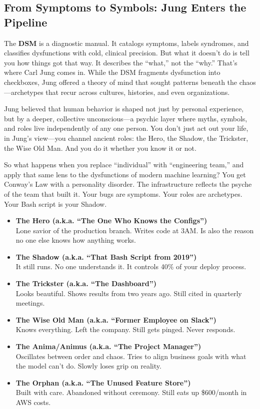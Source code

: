 \subsection{From Symptoms to Symbols: Jung Enters the Pipeline}

The \textbf{DSM} is a diagnostic manual. It catalogs symptoms, labels syndromes, and classifies dysfunctions with cold, clinical precision. But what it doesn’t do is tell you how things got that way. It describes the “what,” not the “why.” That’s where Carl Jung comes in. While the DSM fragments dysfunction into checkboxes, Jung offered a theory of mind that sought patterns beneath the chaos—archetypes that recur across cultures, histories, and even organizations.

Jung believed that human behavior is shaped not just by personal experience, but by a deeper, collective unconscious—a psychic layer where myths, symbols, and roles live independently of any one person. You don’t just act out your life, in Jung’s view—you channel ancient roles: the Hero, the Shadow, the Trickster, the Wise Old Man. And you do it whether you know it or not.

So what happens when you replace “individual” with “engineering team,” and apply that same lens to the dysfunctions of modern machine learning? You get Conway’s Law with a personality disorder. The infrastructure reflects the psyche of the team that built it. Your bugs are symptoms. Your roles are archetypes. Your Bash script is your Shadow.

\begin{itemize}
  \item \textbf{The Hero (a.k.a. “The One Who Knows the Configs”)}\\
  Lone savior of the production branch. Writes code at 3AM. Is also the reason no one else knows how anything works.

  \item \textbf{The Shadow (a.k.a. “That Bash Script from 2019”)}\\
  It still runs. No one understands it. It controls 40\% of your deploy process.

  \item \textbf{The Trickster (a.k.a. “The Dashboard”)}\\
  Looks beautiful. Shows results from two years ago. Still cited in quarterly meetings.

  \item \textbf{The Wise Old Man (a.k.a. “Former Employee on Slack”)}\\
  Knows everything. Left the company. Still gets pinged. Never responds.

  \item \textbf{The Anima/Animus (a.k.a. “The Project Manager”)}\\
  Oscillates between order and chaos. Tries to align business goals with what the model can’t do. Slowly loses grip on reality.

  \item \textbf{The Orphan (a.k.a. “The Unused Feature Store”)}\\
  Built with care. Abandoned without ceremony. Still eats up \$600/month in AWS costs.
\end{itemize}

